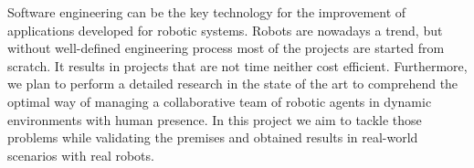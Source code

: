 Software engineering can be the key technology for the improvement of applications developed for robotic systems.
Robots are nowadays a trend, but without well-defined engineering process most of the projects are started from scratch.
It results in projects that are not time neither cost efficient.
Furthermore, we plan to perform a detailed research in the state of the art to comprehend the optimal way of managing a collaborative team of robotic agents in dynamic environments with human presence.
In this project we aim to tackle those problems while validating the premises and obtained results in real-world scenarios with real robots.


